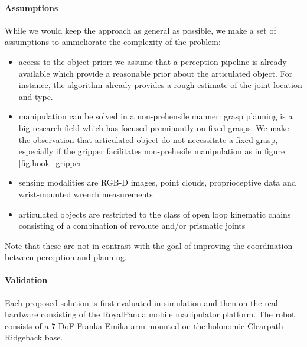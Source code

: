 \paragraph{Assumptions} While we would keep the approach as general as possible, we make a set of assumptions to ammeliorate the complexity of the problem:  
\begin{itemize}
\item access to the object prior: we assume that a perception pipeline is already available which provide a reasonable prior about the articulated object. For instance, the algorithm already provides a rough estimate of the joint location and type. 
\item manipulation can be solved in a non-prehensile manner: grasp planning is a big research field which has focused preminantly on fixed grasps. We make the observation that articulated object do not necessitate a fixed grasp, especially if the gripper facilitates non-prehesile manipulation as in figure \ref{fig:hook_gripper} 
\item sensing modalities are RGB-D images, point clouds, proprioceptive data and wrist-mounted wrench measurements 
\item articulated objects are restricted to the class of open loop kinematic chains consisting of a combination of revolute and/or prismatic joints
\end{itemize} 
Note that these are not in contrast with the goal of improving the coordination between perception and planning.

\paragraph{Validation} Each proposed solution is first evaluated in simulation and then on the real hardware consisting of the RoyalPanda mobile manipulator platform. The robot consists of a 7-DoF Franka Emika arm mounted on the holonomic Clearpath Ridgeback base. 

